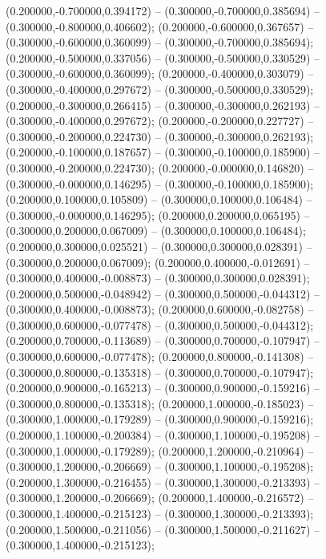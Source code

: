  (0.200000,-0.700000,0.394172) -- (0.300000,-0.700000,0.385694) -- (0.300000,-0.800000,0.406602);
 (0.200000,-0.600000,0.367657) -- (0.300000,-0.600000,0.360099) -- (0.300000,-0.700000,0.385694);
 (0.200000,-0.500000,0.337056) -- (0.300000,-0.500000,0.330529) -- (0.300000,-0.600000,0.360099);
 (0.200000,-0.400000,0.303079) -- (0.300000,-0.400000,0.297672) -- (0.300000,-0.500000,0.330529);
 (0.200000,-0.300000,0.266415) -- (0.300000,-0.300000,0.262193) -- (0.300000,-0.400000,0.297672);
 (0.200000,-0.200000,0.227727) -- (0.300000,-0.200000,0.224730) -- (0.300000,-0.300000,0.262193);
 (0.200000,-0.100000,0.187657) -- (0.300000,-0.100000,0.185900) -- (0.300000,-0.200000,0.224730);
 (0.200000,-0.000000,0.146820) -- (0.300000,-0.000000,0.146295) -- (0.300000,-0.100000,0.185900);
 (0.200000,0.100000,0.105809) -- (0.300000,0.100000,0.106484) -- (0.300000,-0.000000,0.146295);
 (0.200000,0.200000,0.065195) -- (0.300000,0.200000,0.067009) -- (0.300000,0.100000,0.106484);
 (0.200000,0.300000,0.025521) -- (0.300000,0.300000,0.028391) -- (0.300000,0.200000,0.067009);
 (0.200000,0.400000,-0.012691) -- (0.300000,0.400000,-0.008873) -- (0.300000,0.300000,0.028391);
 (0.200000,0.500000,-0.048942) -- (0.300000,0.500000,-0.044312) -- (0.300000,0.400000,-0.008873);
 (0.200000,0.600000,-0.082758) -- (0.300000,0.600000,-0.077478) -- (0.300000,0.500000,-0.044312);
 (0.200000,0.700000,-0.113689) -- (0.300000,0.700000,-0.107947) -- (0.300000,0.600000,-0.077478);
 (0.200000,0.800000,-0.141308) -- (0.300000,0.800000,-0.135318) -- (0.300000,0.700000,-0.107947);
 (0.200000,0.900000,-0.165213) -- (0.300000,0.900000,-0.159216) -- (0.300000,0.800000,-0.135318);
 (0.200000,1.000000,-0.185023) -- (0.300000,1.000000,-0.179289) -- (0.300000,0.900000,-0.159216);
 (0.200000,1.100000,-0.200384) -- (0.300000,1.100000,-0.195208) -- (0.300000,1.000000,-0.179289);
 (0.200000,1.200000,-0.210964) -- (0.300000,1.200000,-0.206669) -- (0.300000,1.100000,-0.195208);
 (0.200000,1.300000,-0.216455) -- (0.300000,1.300000,-0.213393) -- (0.300000,1.200000,-0.206669);
 (0.200000,1.400000,-0.216572) -- (0.300000,1.400000,-0.215123) -- (0.300000,1.300000,-0.213393);
 (0.200000,1.500000,-0.211056) -- (0.300000,1.500000,-0.211627) -- (0.300000,1.400000,-0.215123);
